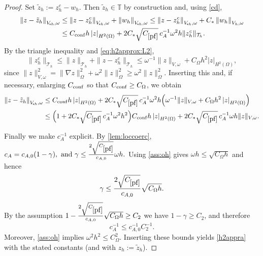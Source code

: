 \documentclass[11pt]{article}
\theoremstyle{definition}
\theoremstyle{plain}
\newcommand{\cA}{c_A}
\newcommand{\CD}{C_*}
\newcommand{\const}[1]{C_{\eqref{#1}}}
\newcommand{\Vsh}{V_{\!\star \hspace*{-0.2mm}h}}
\newcommand{\dgonorm}[1]{\norm{#1}_{V_h,\omega}}
\newcommand{\tdgonorm}[1]{{\Vert#1\Vert}_{\Vsh,\omega}}
\newcommand{\dom}{\Omega}
\newcommand{\Th}{{\calT_h}}
\newcommand*{\snorm}[1]{\left|#1\right|}
\newcommand*{\norm}[1]{\left\|#1\right\|}
\newcommand{\ITh}{\mathbb{T}}
\newcommand{\calT}{\mathcal{T}}
\begin{document}
\begin{proof}
Set $\tilde z_h:=z_h^{c}-w_h$. Then $\tilde z_h\in\ITh$ by construction and, using \eqref{cd},
\begin{align*}
\tdgonorm{z-\tilde z_h}
&\le \tdgonorm{z-z_h^{c}} + \tdgonorm{w_h}
\le \tdgonorm{z-z_h^{c}} + \CD \dgonorm{w_h}
\\
&\le C_{\rm conf} h \snorm{z}_{H^2(\Omega)}
+ 2\CD \sqrt{\const{pf}}\,\cA^{-1} \omega^2 h \|z_h^{c}\|_{\Th}.
\end{align*}
By the triangle inequality and \eqref{eq:h2approx:L2},
\[
\|z_h^{c}\|_{\Th}\le \|z\|_{\Th}+\|z-z_h^{c}\|_{\Th}
\le \omega^{-1}\|z\|_{V,\omega} + C_\dom h^2 \snorm{z}_{H^2(\Omega)},
\]
since $\|z\|_{V,\omega}^2=\|\nabla z\|_\Omega^2+\omega^2\|z\|_\Omega^2\ge \omega^2\|z\|_\Omega^2$.
Inserting this and, if necessary, enlarging $C_{\rm conf}$ so that
$C_{\rm conf}\ge C_\dom$, we obtain
\begin{align*}
\tdgonorm{z-\tilde z_h}
&\le C_{\rm conf} h \snorm{z}_{H^2(\Omega)}
+ 2\CD \sqrt{\const{pf}}\,\cA^{-1} \omega^2 h
\Bigl(\omega^{-1}\|z\|_{V,\omega} + C_\dom h^2 \snorm{z}_{H^2(\Omega)}\Bigr)
\\
&\le \Bigl(1+2\CD \sqrt{\const{pf}}\,\cA^{-1} \omega^2 h^2\Bigr)C_{\rm conf} h \snorm{z}_{H^2(\Omega)}
+ 2\CD \sqrt{\const{pf}}\,\cA^{-1} \omega h \|z\|_{V,\omega}.
\end{align*}

Finally we make $\cA^{-1}$ explicit. By \cref{lem:loccoerc},
$
\cA=c_{A,0}(1-\gamma),
\text{ and }
\gamma\le \frac{2\sqrt{\const{pf}}}{c_{A,0}} \omega h.
$
Using \eqref{ass:oh} gives $\omega h\le \sqrt{C_\Omega h}$ and hence
\[
\gamma\le \frac{2\sqrt{\const{pf}}}{c_{A,0}} \sqrt{C_\Omega h}.
\]
By the assumption
$
1-\frac{2\sqrt{\const{pf}}}{c_{A,0}}\sqrt{C_\Omega h}\ge C_2
$
we have $1-\gamma\ge C_2$, and therefore
\begin{equation}\label{eq:cAinv}
\cA^{-1}\le c_{A,0}^{-1}C_2^{-1}.
\end{equation}
Moreover, \eqref{ass:oh} implies $\omega^2 h^2\le C_\Omega^2$.
Inserting these bounds yields \eqref{h2appra} with the stated constants
(and with $z_h:=\tilde z_h$).
\end{proof}
\end{document}
